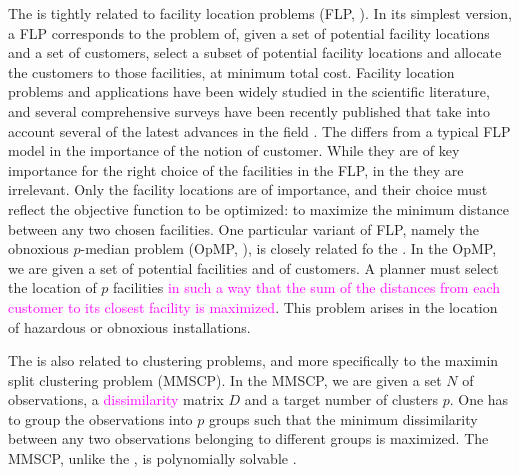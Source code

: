 \documentclass[ijoo,nonblindrev]{informs-ijoo}
\begin{document}
The \pDP{} is tightly related to facility location problems (FLP, \citet{Laporte2015Location}). In its simplest version, a FLP corresponds to the problem of, given a set of potential facility locations and a set of customers, select a subset of potential facility locations and allocate the customers to those facilities, at minimum total cost. Facility location problems and applications have been widely studied in the scientific literature, and several comprehensive surveys have been recently published that take into account several of the latest advances in the field \citep{Laporte2015Location, Melo2009Facility}. The \pDP{} differs from a typical FLP model in the importance of the notion of customer. While they are of key importance for the right choice of the facilities in the FLP, in the \pDP{} they are irrelevant. Only the facility locations are of importance, and their choice must reflect the objective function to be optimized: to maximize the minimum distance between any two chosen facilities. One particular variant of FLP, namely the obnoxious $p$-median problem (OpMP, \citet{Belotti2006branch}), is closely related fo the \pDP{}. In the OpMP, we are given a set of potential facilities and of customers. A planner must select the location of $p$ facilities \textcolor{magenta}{in such a way that the sum of the distances from each customer to its closest facility is maximized}. This problem arises in the location of hazardous or obnoxious installations.

The \pDP{} is also related to clustering problems, and more specifically to the maximin split clustering problem (MMSCP). In the MMSCP, we are given a set $N$ of observations, a \textcolor{magenta}{dissimilarity} matrix $D$ and a target number of clusters $p$. One has to group the observations into $p$ groups such that the minimum dissimilarity between any two observations belonging to different groups is maximized. The MMSCP, unlike the \pDP{}, is polynomially solvable \citep{Delattre1980Bicriterion}.
\end{document}
